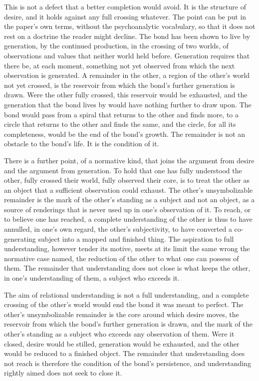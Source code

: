 This is not a defect that a better completion would avoid. It is the structure of desire, and it holds against any full crossing whatever. The point can be put in the paper's own terms, without the psychoanalytic vocabulary, so that it does not rest on a doctrine the reader might decline. The bond has been shown to live by generation, by the continued production, in the crossing of two worlds, of observations and values that neither world held before. Generation requires that there be, at each moment, something not yet observed from which the next observation is generated. A remainder in the other, a region of the other's world not yet crossed, is the reservoir from which the bond's further generation is drawn. Were the other fully crossed, this reservoir would be exhausted, and the generation that the bond lives by would have nothing further to draw upon. The bond would pass from a spiral that returns to the other and finds more, to a circle that returns to the other and finds the same, and the circle, for all its completeness, would be the end of the bond's growth. The remainder is not an obstacle to the bond's life. It is the condition of it.

There is a further point, of a normative kind, that joins the argument from desire and the argument from generation. To hold that one has fully understood the other, fully crossed their world, fully observed their core, is to treat the other as an object that a sufficient observation could exhaust. The other's unsymbolizable remainder is the mark of the other's standing as a subject and not an object, as a source of renderings that is never used up in one's observation of it. To reach, or to believe one has reached, a complete understanding of the other is thus to have annulled, in one's own regard, the other's subjectivity, to have converted a co-generating subject into a mapped and finished thing. The aspiration to full understanding, however tender its motive, meets at its limit the same wrong the normative case named, the reduction of the other to what one can possess of them. The remainder that understanding does not close is what keeps the other, in one's understanding of them, a subject who exceeds it.

\begin{claim}
The aim of relational understanding is not a full understanding, and a complete crossing of the other's world would end the bond it was meant to perfect. The other's unsymbolizable remainder is the core around which desire moves, the reservoir from which the bond's further generation is drawn, and the mark of the other's standing as a subject who exceeds any observation of them. Were it closed, desire would be stilled, generation would be exhausted, and the other would be reduced to a finished object. The remainder that understanding does not reach is therefore the condition of the bond's persistence, and understanding rightly aimed does not seek to close it.
\end{claim}

